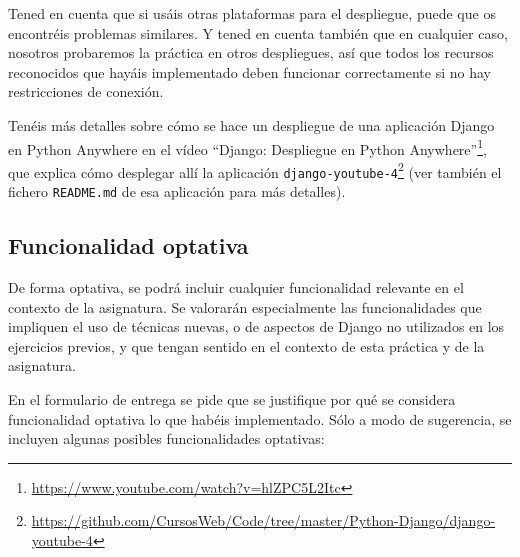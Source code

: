 Tened en cuenta que si usáis otras plataformas para el despliegue, puede que os encontréis problemas similares. Y tened en cuenta también que en cualquier caso, nosotros probaremos la práctica en otros despliegues, así que todos los recursos reconocidos que hayáis implementado deben funcionar correctamente si no hay restricciones de conexión.

Tenéis más detalles sobre cómo se hace un despliegue de una aplicación Django en Python Anywhere en el vídeo ``Django: Despliegue en Python Anywhere''\footnote{\url{https://www.youtube.com/watch?v=hlZPC5L2Itc}}, que explica cómo desplegar allí la aplicación \texttt{django-youtube-4}\footnote{\url{https://github.com/CursosWeb/Code/tree/master/Python-Django/django-youtube-4}} (ver también el fichero \texttt{README.md} de esa aplicación para más detalles).

\subsection{Funcionalidad optativa}

De forma optativa, se podrá incluir cualquier funcionalidad relevante en el contexto de la asignatura. Se valorarán especialmente las funcionalidades que impliquen el uso de técnicas nuevas, o de aspectos de Django no utilizados en los ejercicios previos, y que tengan sentido en el contexto de esta práctica y de la asignatura.

En el formulario de entrega se pide que se justifique por qué se considera funcionalidad optativa lo que habéis implementado. Sólo a modo de sugerencia, se incluyen algunas posibles funcionalidades optativas:

